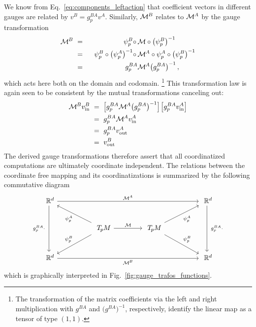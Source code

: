 We know from Eq.~\eqref{eq:components_leftaction} that coefficient vectors in different gauges are related by $v^B = g_p^{BA} v^A$.
Similarly, $\mathcal{M}^{\mkern-1mu B}$ relates to $\mathcal{M}^{\mkern-1mu A}$ by the gauge transformation
\begin{alignat}{2}\label{eq:matrix_gaugetrafo}
    \mathcal{M}^{\mkern-1mu B}
    \ &=&\ \ \psi_p^B \circ\, &\mathcal{M} \circ \big(\psi_p^B\big)^{-1} \notag \\
    \ &=&\ \ \psi_p^B \circ \big(\psi_p^A\big)^{-1} \circ\, &\mathcal{M}^{\mkern-1mu A} \circ \psi_p^A \circ \big(\psi_p^B\big)^{-1} \notag \\
    \ &=&\ \ g_p^{BA} &\mathcal{M}^{\mkern-1mu A} \big(g_p^{BA}\big)^{-1} \,,
\end{alignat}
which acts here both on the domain and codomain.%
\footnote{
    The transformation of the matrix coefficients via the left and right multiplication with $g^{BA}$ and $\big(g^{BA}\big)^{-1}$, respectively, identify the linear map as a tensor of type $(1,1)$.
}
This transformation law is again seen to be consistent by the mutual transformations canceling out:
\begin{align}
    \MBB v^B_\text{in}
    \ &=\ \pig[ g_p^{BA} \MAA \big(g_p^{BA}\big)^{-1} \pig]\, \pig[ g_p^{BA} v_\text{in}^A \pig] \notag \\
    \ &=\ g_p^{BA} \MAA v_\text{in}^A \notag \\
    \ &=\ g_p^{BA} v_\text{out}^A \notag \\
    \ &=\ v_\text{out}^B
\end{align}
The derived gauge transformations therefore assert that all coordinatized computations are ultimately coordinate independent.
The relations between the coordinate free mapping and its coordinatizations is summarized by the following commutative diagram
\begin{equation}\label{eq:linear_map_TpM_diagram}
\begin{tikzcd}[column sep=50pt, row sep=25pt, font=\normalsize]
    \R^d
        \arrow[dd, "g_p^{BA}\cdot\ "']
        \arrow[rrr, "\MAA"]
    & &[-2ex] &
    \R^d
        \arrow[dd, "\ g_p^{BA}\cdot"]
    \\
    &
    \TpM
        \arrow[ul, "\psi_p^A"]
        \arrow[dl, "\psi_p^B"']
        \arrow[r, "\mathcal{M}"]
    &
    \TpM
        \arrow[ur, "\psi_p^A"']
        \arrow[dr, "\psi_p^B"]
    \\
    \R^d
        \arrow[rrr, "\MBB"']
    & & &
    \R^d
\end{tikzcd}
\end{equation}
which is graphically interpreted in Fig.~\ref{fig:gauge_trafos_functions}.

